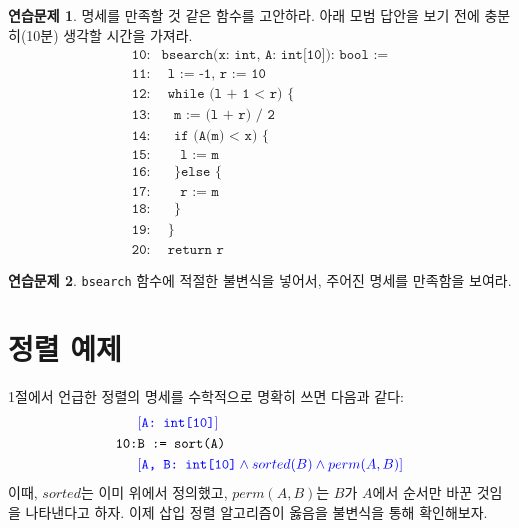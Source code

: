 \documentclass{oblivoir}
\theoremstyle{definition}
\newtheorem{exercise}{연습문제}
\newcommand{\inv}[1]{\textcolor{blue}{\ensuremath{[{#1}]}}}
\begin{document}
\begin{exercise}
  명세를 만족할 것 같은 함수를 고안하라.  아래 모범 답안을 보기 전에
  충분히(10분) 생각할 시간을 가져라.
\begin{align*}
\texttt{10:}& \texttt{bsearch(x: int, A: int[10]): bool :=} \\
\texttt{11:}& \ \ \texttt{l := -1, r := 10} \\
\texttt{12:}& \ \ \texttt{while (l + 1 < r) \{} \\
\texttt{13:}& \ \ \ \ \texttt{m := (l + r) / 2} \\
\texttt{14:}& \ \ \ \ \texttt{if (A(m) < x) \{} \\
\texttt{15:}& \ \ \ \ \ \ \texttt{l := m} \\
\texttt{16:}& \ \ \ \ \texttt{\} else \{} \\
\texttt{17:}& \ \ \ \ \ \ \texttt{r := m} \\
\texttt{18:}& \ \ \ \ \texttt{\}} \\
\texttt{19:}& \ \ \texttt{\}} \\
\texttt{20:}& \ \ \texttt{return r}
\end{align*}
\end{exercise}

\begin{exercise}
  \texttt{bsearch} 함수에 적절한 불변식을 넣어서, 주어진 명세를
  만족함을 보여라.
\end{exercise}

\section{정렬 예제}

1절에서 언급한 정렬의 명세를 수학적으로 명확히 쓰면 다음과 같다:
\begin{align*}
  & \inv{\texttt{A: int[10]}} \\
  \texttt{10:}& \texttt{B := sort(A)} \\
  & \inv{\texttt{A, B: int[10]} \land sorted(B) \land perm(A, B)}
\end{align*}
\noindent 이때, $sorted$는 이미 위에서 정의했고, $perm(A, B)$는 $B$가
$A$에서 순서만 바꾼 것임을 나타낸다고 하자.  이제 삽입 정렬
알고리즘이 옳음을 불변식을 통해 확인해보자.
\end{document}
